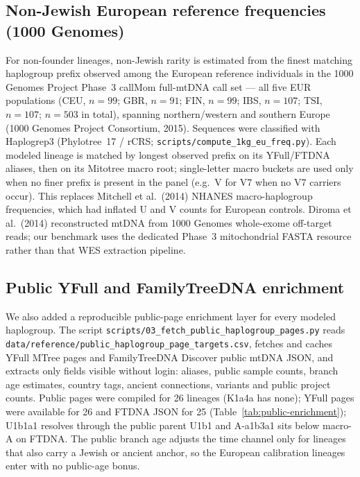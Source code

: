 \documentclass[11pt]{article}
\begin{document}
\subsection{Non-Jewish European reference frequencies (1000 Genomes)}
For non-founder lineages, non-Jewish rarity is estimated from the finest matching haplogroup prefix observed among the European reference individuals in the 1000 Genomes Project Phase~3 callMom full-mtDNA call set --- all five EUR populations (CEU, $n=99$; GBR, $n=91$; FIN, $n=99$; IBS, $n=107$; TSI, $n=107$; $n=503$ in total), spanning northern/western and southern Europe (1000 Genomes Project Consortium, 2015). Sequences were classified with Haplogrep3 (Phylotree~17 / rCRS; \texttt{scripts/compute\_1kg\_eu\_freq.py}). Each modeled lineage is matched by longest observed prefix on its YFull/FTDNA aliases, then on its Mitotree macro root; single-letter macro buckets are used only when no finer prefix is present in the panel (e.g.\ V for V7 when no V7 carriers occur). This replaces Mitchell et al.\ (2014) NHANES macro-haplogroup frequencies, which had inflated U and V counts for European controls. Diroma et al.\ (2014) reconstructed mtDNA from 1000 Genomes whole-exome off-target reads; our benchmark uses the dedicated Phase~3 mitochondrial FASTA resource rather than that WES extraction pipeline.

\subsection{Public YFull and FamilyTreeDNA enrichment}
We also added a reproducible public-page enrichment layer for every modeled haplogroup. The script \texttt{scripts/03\_fetch\_public\_haplogroup\_pages.py} reads \texttt{data/reference/public\_haplogroup\_page\_targets.csv}, fetches and caches YFull MTree pages and FamilyTreeDNA Discover public mtDNA JSON, and extracts only fields visible without login: aliases, public sample counts, branch age estimates, country tags, ancient connections, variants and public project counts. Public pages were compiled for 26 lineages (K1a4a has none); YFull pages were available for 26 and FTDNA JSON for 25 (Table~\ref{tab:public-enrichment}); U1b1a1 resolves through the public parent U1b1 and A-a1b3a1 sits below macro-A on FTDNA. The public branch age adjusts the time channel only for lineages that also carry a Jewish or ancient anchor, so the European calibration lineages enter with no public-age bonus.
\end{document}
